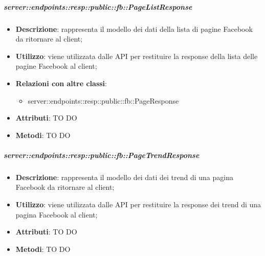     \subparagraph{server::endpoints::resp::public::fb::PageListResponse} %
    \label{subp:bdsm_app_server_endpoints_resp_public_fb_pagelistresponse}
    \begin{itemize}
      \item \textbf{Descrizione}: rappresenta il modello dei dati della lista di pagine Facebook da ritornare al client;
      \item \textbf{Utilizzo}: viene utilizzata dalle API per restituire la response della lista delle pagine Facebook al client;
      \item \textbf{Relazioni con altre classi}:
        \begin{itemize}
          \item server::endpoints::resp::public::fb::PageResponse
        \end{itemize}
	  \item \textbf{Attributi}: TO DO
	  \item \textbf{Metodi}: TO DO
      \end{itemize}

    \subparagraph{server::endpoints::resp::public::fb::PageTrendResponse} %
    \label{subp:bdsm_app_server_endpoints_resp_public_fb_pagetrendresponse}
    \begin{itemize}
      \item \textbf{Descrizione}: rappresenta il modello dei dati dei trend di una pagina Facebook da ritornare al client;
      \item \textbf{Utilizzo}: viene utilizzata dalle API per restituire la response dei trend di una pagina Facebook al client;
	  \item \textbf{Attributi}: TO DO
	  \item \textbf{Metodi}: TO DO
    \end{itemize}

